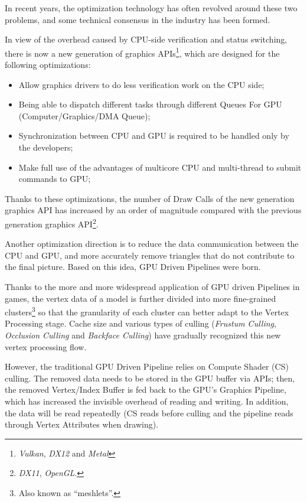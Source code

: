 \documentclass[10pt,journal,compsoc]{IEEEtran}
\begin{document}
\par In recent years, the optimization technology has often revolved around these two problems, and some technical consensus in the industry has been formed.

\par In view of the overhead caused by CPU-side verification and status switching, there is now a new generation of graphics APIs\footnote{\textit{Vulkan}, \textit{DX12} and \textit{Metal}}, which are designed for the following optimizations:

\begin{itemize}
    \item Allow graphics drivers to do less verification work on the CPU side;
    \item Being able to dispatch different tasks through different Queues For GPU (Computer/Graphics/DMA Queue);
    \item Synchronization between CPU and GPU is required to be handled only by the developers;
    \item Make full use of the advantages of multicore CPU and multi-thread to submit commands to GPU;
\end{itemize}

\par Thanks to these optimizations, the number of Draw Calls of the new generation graphics API has increased by an order of magnitude compared with the previous generation graphics API\footnote{\textit{DX11}, \textit{OpenGL}.}.

\par Another optimization direction is to reduce the data communication between the CPU and GPU, and more accurately remove triangles that do not contribute to the final picture. Based on this idea, GPU Driven Pipelines were born. 

\par Thanks to the more and more widespread application of GPU driven Pipelines in games, the vertex data of a model is further divided into more fine-grained clusters\footnote{Also known as “meshlets”.} so that the granularity of each cluster can better adapt to the Vertex Processing stage. Cache size and various types of culling (\textit{Frustum Culling}, \textit{Occlusion Culling} and \textit{Backface Culling}) have gradually recognized this new vertex processing flow.

\par However, the traditional GPU Driven Pipeline relies on Compute Shader (CS) culling. The removed data needs to be stored in the GPU buffer via APIs; then, the removed Vertex/Index Buffer is fed back to the GPU's Graphics Pipeline, which has increased the invisible overhead of reading and writing. In addition, the data will be read repeatedly (CS reads before culling and the pipeline reads through Vertex Attributes when drawing).
\end{document}
